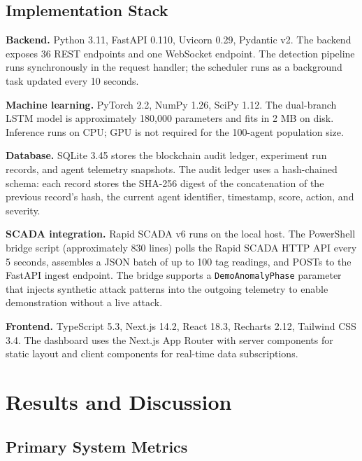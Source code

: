 \subsection{Implementation Stack}
\label{sec:stack}

\textbf{Backend.} Python 3.11, FastAPI 0.110, Uvicorn 0.29, Pydantic v2. The backend exposes 36
REST endpoints and one WebSocket endpoint. The detection pipeline runs synchronously in the request
handler; the scheduler runs as a background task updated every 10 seconds.

\textbf{Machine learning.} PyTorch 2.2, NumPy 1.26, SciPy 1.12. The dual-branch LSTM model is
approximately 180,000 parameters and fits in 2 MB on disk. Inference runs on CPU; GPU is not
required for the 100-agent population size.

\textbf{Database.} SQLite 3.45 stores the blockchain audit ledger, experiment run records, and
agent telemetry snapshots. The audit ledger uses a hash-chained schema: each record stores the
SHA-256 digest of the concatenation of the previous record's hash, the current agent identifier,
timestamp, score, action, and severity.

\textbf{SCADA integration.} Rapid SCADA v6 runs on the local host. The PowerShell bridge script
(approximately 830 lines) polls the Rapid SCADA HTTP API every 5 seconds, assembles a JSON batch
of up to 100 tag readings, and POSTs to the FastAPI ingest endpoint. The bridge supports a
\texttt{DemoAnomalyPhase} parameter that injects synthetic attack patterns into the outgoing
telemetry to enable demonstration without a live attack.

\textbf{Frontend.} TypeScript 5.3, Next.js 14.2, React 18.3, Recharts 2.12, Tailwind CSS 3.4.
The dashboard uses the Next.js App Router with server components for static layout and client
components for real-time data subscriptions.

\section{Results and Discussion}
\label{sec:results}

\subsection{Primary System Metrics}
\label{sec:primary}

